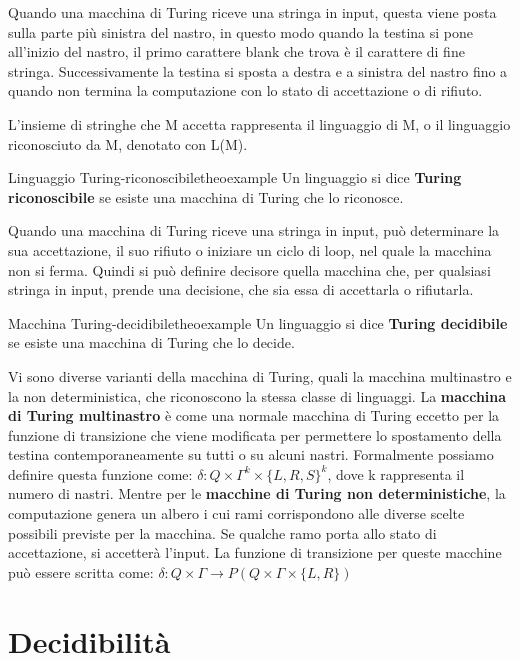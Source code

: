 \documentclass[a4paper]{extarticle}
\begin{document}
Quando una macchina di Turing riceve una stringa in input, questa viene posta sulla parte più sinistra del nastro, in questo modo quando la testina si pone all'inizio del nastro, il primo carattere blank che trova è il carattere di fine stringa. Successivamente la testina si sposta a destra e a sinistra del nastro fino a quando non termina la computazione con lo stato di accettazione o di rifiuto.

L'insieme di stringhe che M accetta rappresenta il linguaggio di M, o il linguaggio riconosciuto da M, denotato con L(M).

\begin{definizione}{Linguaggio Turing-riconoscibile}{theoexample}
Un linguaggio si dice \textbf{Turing riconoscibile} se esiste una macchina di Turing che lo riconosce.
\end{definizione}

Quando una macchina di Turing riceve una stringa in input, può determinare la sua accettazione, il suo rifiuto o iniziare un ciclo di loop, nel quale la macchina non si ferma. Quindi si può definire decisore quella macchina che, per qualsiasi stringa in input, prende una decisione, che sia essa di accettarla o rifiutarla.

\begin{definizione}{Macchina Turing-decidibile}{theoexample}
Un linguaggio si dice \textbf{Turing decidibile} se esiste una macchina di Turing che lo decide.
\end{definizione}

Vi sono diverse varianti della macchina di Turing, quali la macchina multinastro e la non deterministica, che riconoscono la stessa classe di linguaggi. La \textbf{macchina di Turing multinastro} è come una normale macchina di Turing eccetto per la funzione di transizione che viene modificata per permettere lo spostamento della testina contemporaneamente su tutti o su alcuni nastri. Formalmente possiamo definire questa funzione come: $ \delta : Q \times \Gamma^k \times \{L,R,S\}^k$, dove k rappresenta il numero di nastri. Mentre per le \textbf{macchine di Turing non deterministiche}, la computazione genera un albero i cui rami corrispondono alle diverse scelte possibili previste per la macchina. Se qualche ramo porta allo stato di accettazione, si accetterà l'input. La funzione di  transizione per queste macchine può essere scritta come: $ \delta : Q \times \Gamma \longrightarrow P(Q\times \Gamma \times \{L,R\})$

\newpage
\section{Decidibilità}
\end{document}
